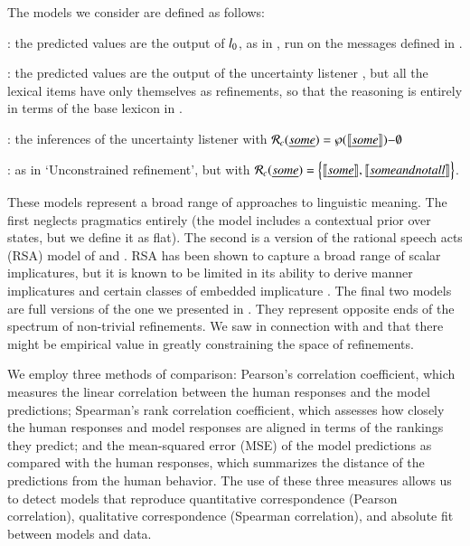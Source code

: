 \documentclass[leqno,12pt]{article}
\begin{document}
The models we consider are defined as follows:
%
\begin{examples}
\item 
  \begin{examples}
  \item {}: the predicted values are the output
    of $l_{0}$, as in , run on the messages
    defined in .
  \item {}: the predicted values are the
    output of the uncertainty listener , but all the
    lexical items have only themselves as refinements, so that the
    reasoning is entirely in terms of the base lexicon in
    .
  \item {}: the inferences of the
    uncertainty listener  with $\mathcal{R}_{c}(\emph{some})
    = \wp(\llbracket\emph{some}\rrbracket){-}\emptyset$
  \item {}: as in `Unconstrained
    refinement', but with $\mathcal{R}_{c}(\emph{some}) =
    \left\{ \llbracket\emph{some}\rrbracket, \llbracket\emph{some and not all}\rrbracket \right\}$.
  \end{examples}
\end{examples}

These models represent a broad range of approaches to linguistic
meaning. The first neglects pragmatics entirely (the model includes a
contextual prior over states, but we define it as flat). The second is
a version of the rational speech acts (RSA) model of
\citet{Frank:Goodman:2012} and \citet{Goodman:Stuhlmuller:2013}. RSA
has been shown to capture a broad range of scalar implicatures, but it
is known to be limited in its ability to derive manner implicatures
and certain classes of embedded implicature
\citep{Bergen:Goodman:Levy:2012,Bergen:Levy:Goodman:2014}. The final
two models are full versions of the one we presented in
. They represent opposite ends of the spectrum of
non-trivial refinements. We saw in connection with
 and  that there
might be empirical value in greatly constraining the space of
refinements.

We employ three methods of comparison: Pearson's correlation
coefficient, which measures the linear correlation between the human
responses and the model predictions; Spearman's rank correlation
coefficient, which assesses how closely the human responses and model
responses are aligned in terms of the rankings they predict; and the
mean-squared error (MSE) of the model predictions as compared with the
human responses, which summarizes the distance of the predictions from
the human behavior. The use of these three measures allows us to
detect models that reproduce quantitative correspondence (Pearson
correlation), qualitative correspondence (Spearman correlation), and
absolute fit between models and data.
\end{document}
